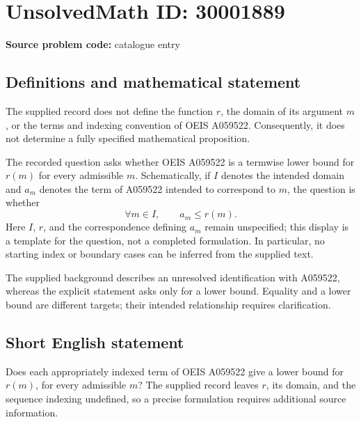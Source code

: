 \documentclass[11pt]{article}
\begin{document}
\section*{UnsolvedMath ID: 30001889}
\textbf{Source problem code:} catalogue entry
\subsection{Definitions and mathematical statement}
The supplied record does not define the function \(r\), the domain of its argument \(m\), or the terms and indexing convention of OEIS A059522. Consequently, it does not determine a fully specified mathematical proposition.

The recorded question asks whether OEIS A059522 is a termwise lower bound for \(r(m)\) for every admissible \(m\). Schematically, if \(I\) denotes the intended domain and \(a_m\) denotes the term of A059522 intended to correspond to \(m\), the question is whether
\[
\forall m\in I,\qquad a_m\le r(m).
\]
Here \(I\), \(r\), and the correspondence defining \(a_m\) remain unspecified; this display is a template for the question, not a completed formulation. In particular, no starting index or boundary cases can be inferred from the supplied text.

The supplied background describes an unresolved identification with A059522, whereas the explicit statement asks only for a lower bound. Equality and a lower bound are different targets; their intended relationship requires clarification.
\subsection{Short English statement}
Does each appropriately indexed term of OEIS A059522 give a lower bound for \(r(m)\), for every admissible \(m\)? The supplied record leaves \(r\), its domain, and the sequence indexing undefined, so a precise formulation requires additional source information.
\end{document}
